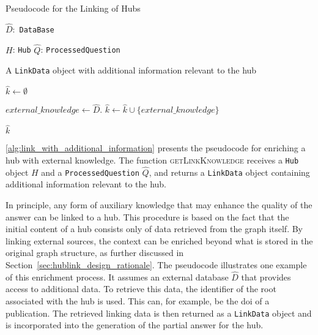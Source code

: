\begin{algorithm}[t]
\caption{Pseudocode for the Linking of Hubs}
\label{alg:link_with_additional_information}
\begin{algorithmic}[1]

\PersistentState
    \Statex $\hat{D}:$ \texttt{DataBase} 

\Require
    \Statex $H$: \texttt{Hub} 
    \Statex $\hat{Q}$: \texttt{ProcessedQuestion} 

\Ensure
    \Statex A \texttt{LinkData} object with additional information relevant to the hub

\Statex
{}
    \State $\hat{k} \gets \emptyset$ 

    \State $external\_knowledge \gets\hat{D}$.
    \State $\hat{k} \gets \hat{k} \cup \{external\_knowledge\}$

    \State \Return $\hat{k}$
\EndFunction

\end{algorithmic}
\end{algorithm}

\autoref{alg:link_with_additional_information} presents the pseudocode for enriching a hub with external knowledge. The function \textsc{getLinkKnowledge} receives a \texttt{Hub} object \(H\) and a \texttt{ProcessedQuestion} \(\hat{Q}\), and returns a \texttt{LinkData} object containing additional information relevant to the hub.

In principle, any form of auxiliary knowledge that may enhance the quality of the answer can be linked to a hub. This procedure is based on the fact that the initial content of a hub consists only of data retrieved from the graph itself. By linking external sources, the context can be enriched beyond what is stored in the original graph structure, as further discussed in Section~\ref{sec:hublink_design_rationale}. The pseudocode illustrates one example of this enrichment process. It assumes an external database \(\hat{D}\) that provides access to additional data. To retrieve this data, the identifier of the root associated with the hub is used. This can, for example, be the \gls{doi} of a publication. The retrieved linking data is then returned as a \texttt{LinkData} object and is incorporated into the generation of the partial answer for the hub.


